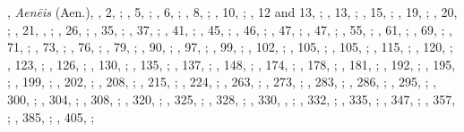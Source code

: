 \begin{autindex}
,
  \subitem \emph{Aenēis} (Aen.),
    ,   2, ;
    ,   5, ;
    ,   6, ;
    ,   8, ;
    ,  10, ;
    ,  12 and 13, ;
    ,  13, ;
    ,  15, ;
    ,  19, ;
    ,  20, ;
    ,  21, , ;
    ,  26, ;
    ,  35, ;
    ,  37, ;
    ,  41, ;
    ,  45, ;
    ,  46, ;
    ,  47, ;
    ,  47, ;
    ,  55, ;
    ,  61, ;
    ,  69, ;
    ,  71, ;
    ,  73, ;
    ,  76, ;
    ,  79, ;
    ,  90, ;
    ,  97, ;
    ,  99, ;
    , 102, ;
    , 105, ;
    , 105, ;
    , 115, ;
    , 120, ;
    , 123, ;
    , 126, ;
    , 130, ;
    , 135, ;
    , 137, ;
    , 148, ;
    , 174, ;
    , 178, ;
    , 181, ;
    , 192, ;
    , 195, ;
    , 199, ;
    , 202, ;
    , 208, ;
    , 215, ;
    , 224, ;
    , 263, ;
    , 273, ;
    , 283, ;
    , 286, ;
    , 295, ;
    , 300, ;
    , 304, ;
    , 308, ;
    , 320, ;
    , 325, ;
    , 328, ;
    , 330, , ;
    , 332, ;
    , 335, ;
    , 347, ;
    , 357, ;
    , 385, ;
    , 405, ;

\end{autindex}
